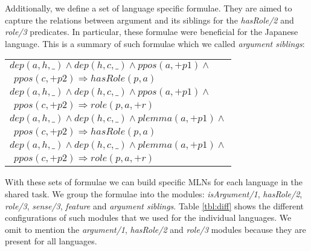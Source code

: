 Additionally, we define a set of language specific formulae. They are aimed to 
capture the relations between argument and its siblings for the \emph{hasRole/2} 
and \emph{role/3} predicates.  In particular, these formulae were beneficial for 
the Japanese language.  This is a summary of such formulae which we called 
\emph{argument siblings}:
\begin{tabular}{p{7.5cm}}
   $ dep(a,h,\_) \land dep(h,c,\_) \land ppos(a,+p1) \land $\\$\ \ ppos(c,+p2) 
   \Rightarrow hasRole(p,a)    $\\
   $ dep(a,h,\_) \land dep(h,c,\_) \land ppos(a,+p1) \land $\\$\ \ ppos(c,+p2) 
   \Rightarrow role(p,a,+r)    $\\
   $ dep(a,h,\_) \land dep(h,c,\_) \land plemma(a,+p1) \land $\\$\ \ ppos(c,+p2) 
   \Rightarrow hasRole(p,a)    $\\
   $ dep(a,h,\_) \land dep(h,c,\_) \land plemma(a,+p1) \land $\\$\ \ ppos(c,+p2) 
   \Rightarrow role(p,a,+r)    $\\
\end{tabular}


With these sets of formulae we can build specific MLNs for each language in the 
shared task. We group the formulae into the modules: \emph{isArgument/1}, 
\emph{hasRole/2}, \emph{role/3}, \emph{sense/3}, \emph{feature} and 
\emph{argument siblings}.  Table \ref{tbl:diff} shows the different 
configurations of such modules that we used for the individual languages.  We 
omit to mention the \emph{argument/1}, \emph{hasRole/2} and \emph{role/3} 
modules because they are present for all languages. 


